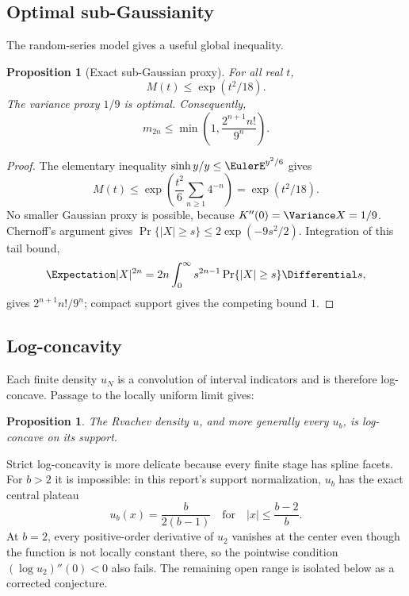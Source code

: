 \documentclass[11pt,oneside]{article}
\newtheorem{proposition}[theorem]{Proposition}
\theoremstyle{definition}
\theoremstyle{remark}
\begin{document}
\subsection{Optimal sub-Gaussianity}

The random-series model gives a useful global inequality.

\begin{proposition}[Exact sub-Gaussian proxy]
\label{prop:subgaussian}
For all real \(t\),
\begin{equation}
 M(t)\leq \exp(t^2/18).
 \label{eq:subgaussian}
\end{equation}
The variance proxy \(1/9\) is optimal.
Consequently,
\begin{equation}
 m_{2n}\leq
 \min\!\left(1,\frac{2^{n+1}n!}{9^n}\right).
 \label{eq:moment-bound}
\end{equation}
\end{proposition}

\begin{proof}
The elementary inequality
\(\sinh y/y\leq\EulerE^{y^2/6}\) gives
\[
 M(t)
 \leq
 \exp\!\left(
  \frac{t^2}{6}\sum_{n\geq1}4^{-n}
 \right)
 =\exp(t^2/18).
\]
No smaller Gaussian proxy is possible, because
\(K''(0)=\Variance X=1/9\).  Chernoff's argument gives
\(\Pr\{|X|\geq s\}\leq2\exp(-9s^2/2)\).  Integration of this tail bound,
\[
 \Expectation|X|^{2n}
 =2n\int_0^\infty s^{2n-1}\Pr\{|X|\geq s\}\Differential s,
\]
gives \(2^{n+1}n!/9^n\); compact support gives the competing bound \(1\).
\end{proof}

\subsection{Log-concavity}

Each finite density \(u_N\) is a convolution of interval indicators and is
therefore log-concave.  Passage to the locally uniform limit gives:

\begin{proposition}
The Rvachev density \(u\), and more generally every \(u_b\), is log-concave
on its support.
\end{proposition}

Strict log-concavity is more delicate because every finite stage has spline
facets.  For \(b>2\) it is impossible: in this report's support
normalization, \(u_b\) has the exact central plateau
\[
 u_b(x)=\frac{b}{2(b-1)}
 \quad\text{for}\quad |x|\leq\frac{b-2}{b}.
\]
At \(b=2\), every positive-order derivative of \(u_2\) vanishes at the
center even though the function is not locally constant there, so the
pointwise condition \((\log u_2)''(0)<0\) also fails.  The remaining open
range is isolated below as a corrected conjecture.
\end{document}
